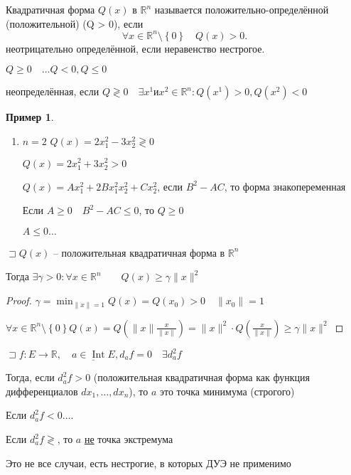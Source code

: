 \documentclass{book}
\newcommand\R{\ensuremath{\mathbb{R}}}
\theoremstyle{definition}
\newtheorem*{example}{Пример}
\DeclareMathOperator{\Int}{Int}
\begin{document}
        \begin{definition}
            Квадратичная форма $Q(x)$ в  $\R^n$ называется положительно-определённой (положительной) (Q > 0), если 
            \[\forall x\in \R^n \setminus \left\{ 0 \right\} \quad Q(x) >0.\]
        неотрицательно определённой, если неравенство нестрогое. 

        $Q \geqslant 0\quad \ldots Q<0, Q\leqslant 0$


        неопределённая, если $Q \gtrless 0\quad \exists x^1 и x^2 \in \R^n: Q\left( x^1 \right) >0, Q\left( x^2 \right) <0$
        \end{definition}
        \begin{example}
            \begin{enumerate}
                \item $n=2$ $Q(x) = 2x_1^2 - 3x_2^2 \gtrless 0$
                    
                    $Q(x) = 2x_1^2 + 3x_2^2 >0$

                    $Q(x)  =Ax_1^2 + 2Bx_1^2x_2^2 + Cx_2^2$, если $B^2-AC$, то форма знакопеременная

                    Если $A\geqslant 0\quad B^2-AC\leqslant 0$, то $Q \geqslant 0$

                    $A\leqslant 0 \ldots$
            \end{enumerate}
        \end{example}

        \begin{lemma}
            $\sqsupset Q(x)$ -- положительная квадратичная форма в $\R^n$

            Тогда $\exists \gamma >0: \forall x\in \R^n\qquad Q(x) \geqslant \gamma \|x\|^2$
        \end{lemma}
        \begin{proof}
            $\gamma  = \min_{\|x\| = 1}Q(x) = Q(x_0) >0\quad \|x_0\|=1$

            $\forall x\in \R^n \setminus \left\{ 0 \right\} Q(x) = Q\left( \|x\| \frac{x}{\|x\|}\right) = \|x\|^2 \cdot  Q\left( \frac{x}{\|x\|} \right)  \geqslant  \gamma \|x\|^2$
        \end{proof}

        \begin{statement}

            $\sqsupset f: E\to \R, \quad \underline{a\in \Int E}, d_a f = 0\quad \exists  d^2_a f$ 

            Тогда, если $d^2_af>0$ (положительная квадратичная форма как функция дифференциалов  $dx_1, \ldots, dx_{n} $), то $a$ это точка минимума (строгого)

            Если  $d^2_af <0 \ldots.$

            Если $d^2_af \gtrless$, то $a$ \underline{не} точка экстремума

            Это не все случаи, есть нестрогие, в которых ДУЭ не применимо
        \end{statement}
\end{document}
